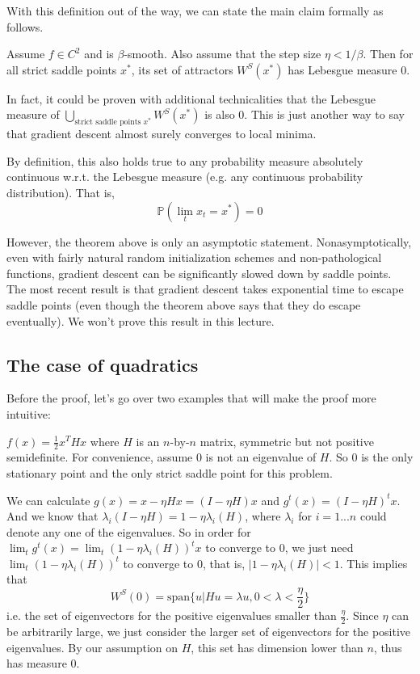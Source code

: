 With this definition out of the way, we can state the main claim formally as
follows.

\begin{theorem}
Assume $f\in C^2$ and is $\beta$-smooth. Also assume that the step size $\eta <
1/\beta$. Then for all strict saddle points $x^*$, its set of attractors
$W^S(x^*)$ has Lebesgue measure $0$.
\end{theorem}

\begin{remark}
In fact, it could be proven with additional technicalities that the Lebesgue measure of 
$
\bigcup_{\text{strict saddle points }x^*} W^S(x^*)
$
is also 0. This is just another way to say that gradient descent almost surely converges to local minima. 
\end{remark}

\begin{remark}
By definition, this also holds true to any probability measure absolutely continuous w.r.t. the Lebesgue measure (e.g. any continuous probability distribution). That is,
$$\mathbb{P}(\lim_t x_t = x^*) = 0$$
\end{remark}

However, the theorem above is only an asymptotic statement. Nonasymptotically, even with fairly natural random initialization schemes and non-pathological functions, gradient descent can be significantly slowed down by saddle points. 
The most recent result \cite{du2017gradient} is that gradient descent takes exponential time to escape saddle points (even though the theorem above says that they do escape eventually). We won't prove this result in this lecture.

\subsection{The case of quadratics}
Before the proof, let's go over two examples that will make the proof more intuitive:

\begin{example}
$f(x) = \frac{1}{2} x^THx$ where $H$ is an $n$-by-$n$ matrix, symmetric but not positive semidefinite. 
For convenience, assume $0$ is not an eigenvalue of $H$.
So $0$ is the only stationary point and the only strict saddle point for this problem.

We can calculate
$g(x) = x - \eta Hx = (I-\eta H)x$ and 
$g^t(x) = (I-\eta H)^tx$. 
And we know that 
$\lambda_i(I - \eta H) = 
1-\eta \lambda_i(H)$, where $\lambda_i$ for $i=1...n$ could denote any one of the eigenvalues.
So in order for $\lim_t g^t(x) = \lim_t (1-\eta \lambda_i(H))^t x$ to converge to 0, we just need $\lim_t (1-\eta \lambda_i(H))^t$ to converge to 0, that is, $|1-\eta \lambda_i(H)| < 1$. This implies that
$$W^S(0) = \text{span}\bigg\{ u| Hu=\lambda u,  0< \lambda < \frac{\eta}{2} \bigg\}$$
i.e. the set of eigenvectors for the positive eigenvalues smaller than 
$\frac{\eta}{2}$. Since $\eta$ can be arbitrarily large, we just consider the larger set of eigenvectors for the positive eigenvalues. By our assumption on $H$, this set has dimension lower than $n$, thus has measure 0.
\end{example}

